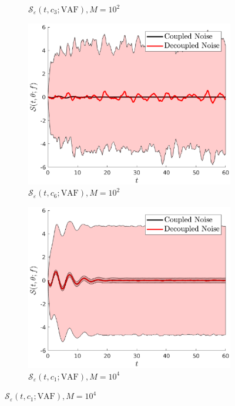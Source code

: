 \documentclass[a4paper,10pt]{beamer}
\newcommand{\rb}[1]{\left( #1 \right)}
\begin{document}
\begin{frame}
\begin{figure}[H]
\begin{subfigure}{0.32\linewidth}
				\caption{\tiny $\mathcal{S}_{\varepsilon} \rb{t,c_{3};\text{VAF}}, M = 10^{2}$}
			\end{subfigure}
			\begin{subfigure}{0.32\linewidth}
				\includegraphics[width=\linewidth]{./Plots/sensitivityAnalysis/c6M100.eps}
				\caption{\tiny $\mathcal{S}_{\varepsilon} \rb{t,c_{6};\text{VAF}}, M = 10^{2}$}
			\end{subfigure}
			\begin{subfigure}{0.32\linewidth}
				\includegraphics[width=\linewidth]{./Plots/sensitivityAnalysis/c1M10000.eps}
				\caption{\tiny $\mathcal{S}_{\varepsilon} \rb{t,c_{1};\text{VAF}}, M = 10^{4}$}

\end{subfigure}
\end{figure}
\end{frame}
\end{document}
